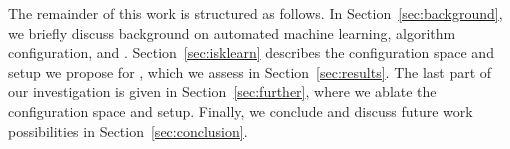 The remainder of this work is structured as follows. In Section~\ref{sec:background}, we briefly discuss background on automated machine learning, algorithm configuration, and \irace. Section~\ref{sec:isklearn} describes the configuration space and setup we propose for \isklearn, which we assess in Section~\ref{sec:results}. The last part of our investigation is given in Section~\ref{sec:further}, where we ablate the configuration space and setup. Finally, we conclude and discuss future work possibilities in Section~\ref{sec:conclusion}.

